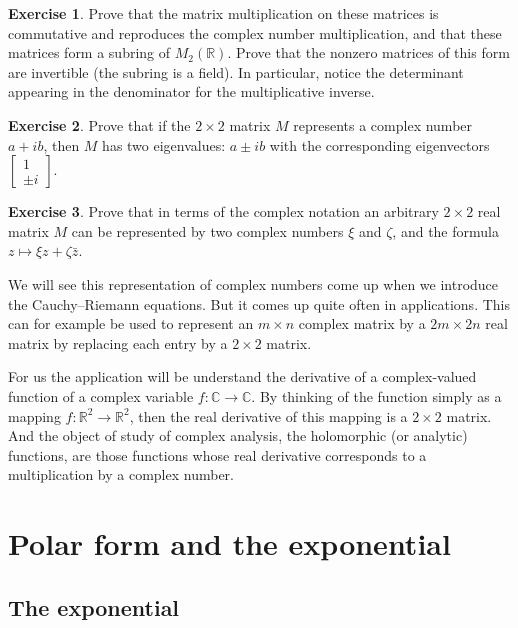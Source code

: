 \documentclass[12pt,openany]{book}
\newcommand{\C}{{\mathbb{C}}}
\newcommand{\R}{{\mathbb{R}}}
\theoremstyle{plain}
\theoremstyle{remark}
\theoremstyle{definition}
\newenvironment{exbox}{%
    \def\FrameCommand{\vrule width 1pt \relax\hspace {10pt}}%
    \MakeFramed {\advance \hsize -\width \FrameRestore }%
}{%
    \endMakeFramed
}
\theoremstyle{exercise}
\newtheorem{exercise}{Exercise}[section]
\theoremstyle{example}
\begin{document}
\begin{exbox}
\begin{exercise}
Prove that the matrix multiplication on these matrices is commutative
and reproduces the complex
number multiplication, and that these matrices form a subring of $M_2(\R)$.
Prove that the nonzero matrices of this form are
invertible (the subring is a field).  In particular, notice the
determinant appearing in the denominator for the multiplicative inverse.
\end{exercise}

\begin{exercise}
Prove that if the $2 \times 2$ matrix $M$ represents a complex number
$a+ib$, then $M$ has two eigenvalues: $a \pm i b$ with the corresponding
eigenvectors $\left[ \begin{smallmatrix} 1 \\ \pm i \end{smallmatrix}
\right]$.
\end{exercise}

\begin{exercise}
Prove that
in terms of the complex notation an arbitrary $2 \times 2$ real matrix $M$
can be represented by two complex numbers $\xi$ and $\zeta$, and the formula
$z \mapsto \xi z + \zeta \bar{z}$.
\end{exercise}
\end{exbox}

We will see this representation of complex numbers come up when we introduce the
Cauchy--Riemann equations.  But it comes up quite often in applications.
This can for example be used to represent an $m \times n$ complex matrix by a
$2m \times 2n$ real matrix by replacing each entry by a $2 \times 2$ matrix.

For us the application will be understand the derivative of a
complex-valued function of a complex variable $f \colon \C \to \C$.
By thinking of the function simply as a mapping $f \colon \R^2 \to \R^2$,
then the real derivative of this mapping is a $2 \times 2$ matrix.  And the
object of study of complex analysis, the holomorphic (or analytic)
functions, are those functions whose real derivative corresponds to a
multiplication by a complex number.

\section{Polar form and the exponential}

\subsection{The exponential}
\end{document}
